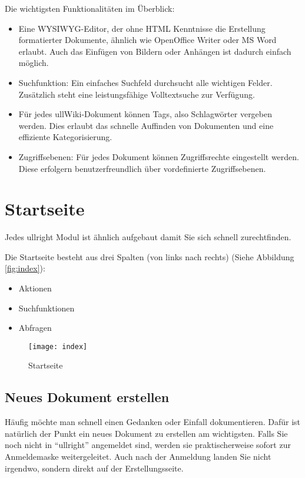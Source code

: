\documentclass[article, a4paper, oneside, 11pt]{memoir}
\begin{document}
Die wichtigsten Funktionalitäten im Überblick:

\begin{itemize}
\item Eine WYSIWYG-Editor, der ohne HTML Kenntnisse die Erstellung formatierter Dokumente, ähnlich wie OpenOffice Writer oder MS Word erlaubt. Auch das Einfügen von Bildern oder Anhängen ist dadurch einfach möglich.
\item Suchfunktion: Ein einfaches Suchfeld durchsucht alle wichtigen Felder. Zusätzlich steht eine leistungsfähige Volltextsuche zur Verfügung.
\item Für jedes ullWiki-Dokument können Tags, also Schlagwörter vergeben werden. Dies erlaubt das schnelle Auffinden von Dokumenten und eine effiziente Kategorisierung.
\item Zugriffsebenen: Für jedes Dokument können Zugriffsrechte eingestellt werden. Diese erfolgern benutzerfreundlich über vordefinierte Zugriffsebenen.
\end{itemize}




\chapter{Startseite}

Jedes ullright Modul ist ähnlich aufgebaut damit Sie sich schnell zurechtfinden.

Die Startseite besteht aus drei Spalten (von links nach rechts) (Siehe Abbildung \vref{fig:index}):

\begin{itemize}
\item Aktionen
\item Suchfunktionen
\item Abfragen
\end{itemize}

\begin{figure}[htp]
\centering
\texttt{[image: index]}
\caption{Startseite}
\label{fig:index}
\end{figure}

\section{Neues Dokument erstellen}
Häufig möchte man schnell einen Gedanken oder Einfall dokumentieren. Dafür ist natürlich der Punkt ein neues Dokument zu erstellen am wichtigsten. Falls Sie noch nicht in "`ullright"' angemeldet sind, werden sie praktischerweise sofort zur Anmeldemaske weitergeleitet. Auch nach der Anmeldung landen Sie nicht irgendwo, sondern direkt auf der Erstellungsseite.
\end{document}

